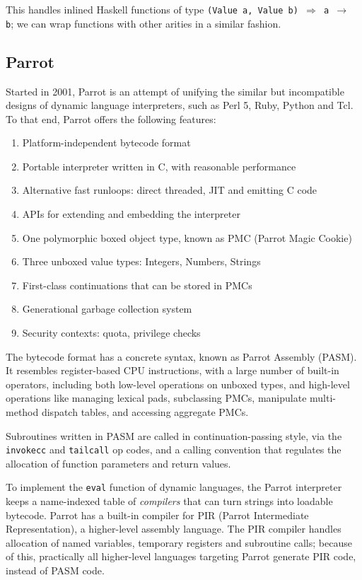 \documentclass[]{sigplanconf}
\newcommand{\code}[1]{\texttt{#1}}
\begin{document}
This handles inlined Haskell functions of type \code{(Value a, Value b)
$\Rightarrow$ a $\to$ b}; we can wrap functions with other arities in a
similar fashion.

\subsection{Parrot}
\label{sec:Parrot}

Started in 2001, Parrot is an attempt of unifying the similar but incompatible
designs of dynamic language interpreters, such as Perl 5, Ruby, Python and Tcl.
To that end, Parrot offers the following features:

\begin{enumerate}
\item Platform-independent bytecode format
\item Portable interpreter written in C, with reasonable performance
\item Alternative fast runloops: direct threaded, JIT and emitting C code
\item APIs for extending and embedding the interpreter
\item One polymorphic boxed object type, known as PMC (Parrot Magic Cookie)
\item Three unboxed value types: Integers, Numbers, Strings
\item First-class continuations that can be stored in PMCs
\item Generational garbage collection system
\item Security contexts: quota, privilege checks
\end{enumerate}

The bytecode format has a concrete syntax, known as Parrot Assembly (PASM).
It resembles register-based CPU instructions, with a large number of built-in
operators, including both low-level operations on unboxed types, and high-level
operations like managing lexical pads, subclassing PMCs, manipulate
multi-method dispatch tables, and accessing aggregate PMCs.

Subroutines written in PASM are called in continuation-passing style, via the
\code{invokecc} and \code{tailcall} op codes, and a calling convention that
regulates the allocation of function parameters and return values.

To implement the \code{eval} function of dynamic languages, the Parrot interpreter
keeps a name-indexed table of \emph{compilers} that can turn strings into loadable
bytecode.  Parrot has a built-in compiler for PIR (Parrot Intermediate
Representation), a higher-level assembly language.  The PIR compiler handles
allocation of named variables, temporary registers and subroutine calls;
because of this, practically all higher-level languages targeting Parrot
generate PIR code, instead of PASM code.
\end{document}
